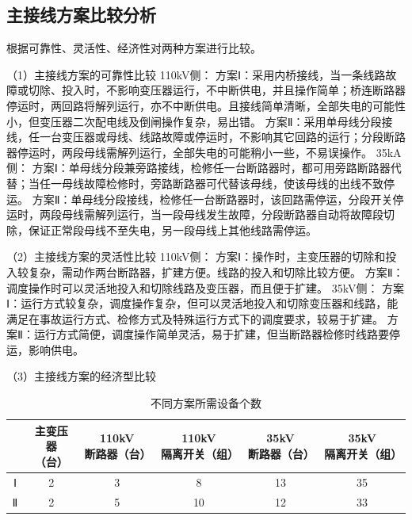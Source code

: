 \subsection{主接线方案比较分析}
根据可靠性、灵活性、经济性对两种方案进行比较。\par 
（1）主接线方案的可靠性比较\newline
110kV侧：\newline
方案Ⅰ：采用内桥接线，当一条线路故障或切除、投入时，不影响变压器运行，不中断供电，并且操作简单；桥连断路器停运时，两回路将解列运行，亦不中断供电。且接线简单清晰，全部失电的可能性小，但变压器二次配电线及倒闸操作复杂，易出错。\newline
方案Ⅱ：采用单母线分段接线，任一台变压器或母线、线路故障或停运时，不影响其它回路的运行；分段断路器停运时，两段母线需解列运行，全部失电的可能稍小一些，不易误操作。\newline
35kA侧：\newline
方案Ⅰ：单母线分段兼旁路接线，检修任一台断路器时，都可用旁路断路器代替；当任一母线故障检修时，旁路断路器可代替该母线，使该母线的出线不致停运。\newline
方案Ⅱ：单母线分段接线，检修任一台断路器时，该回路需停运，分段开关停运时，两段母线需解列运行，当一段母线发生故障，分段断路器自动将故障段切除，保证正常段母线不至失电，另一段母线上其他线路需停运。\par 
（2）主接线方案的灵活性比较\newline
110kV侧：\newline
方案Ⅰ：操作时，主变压器的切除和投入较复杂，需动作两台断路器，扩建方便。线路的投入和切除比较方便。\newline
方案Ⅱ：调度操作时可以灵活地投入和切除线路及变压器，而且便于扩建。\newline
35kV侧：\newline
方案Ⅰ：运行方式较复杂，调度操作复杂，但可以灵活地投入和切除变压器和线路，能满足在事故运行方式、检修方式及特殊运行方式下的调度要求，较易于扩建。\newline
方案Ⅱ：运行方式简便，调度操作简单灵活，易于扩建，但当断路器检修时线路要停运，影响供电。\par 
（3）主接线方案的经济型比较
\begin{table}[!ht]
	\centering
	\begin{tabular}{|c|c|c|c|c|c|}
		\hline
		~ & \makecell{主变压器\\（台）}  & \makecell{110kV\\断路器（台）}  & \makecell{110kV\\隔离开关（组）}  & \makecell{35kV\\断路器（台）}  & \makecell{35kV\\隔离开关（组）} \\ \hline
		Ⅰ & 2 & 3 & 8 & 13 & 35 \\ \hline
		Ⅱ & 2 & 5 & 10 & 12 & 33 \\ \hline
	\end{tabular}
	\caption{不同方案所需设备个数}
	\label{不同方案所需设备个数}
\end{table}\par 
